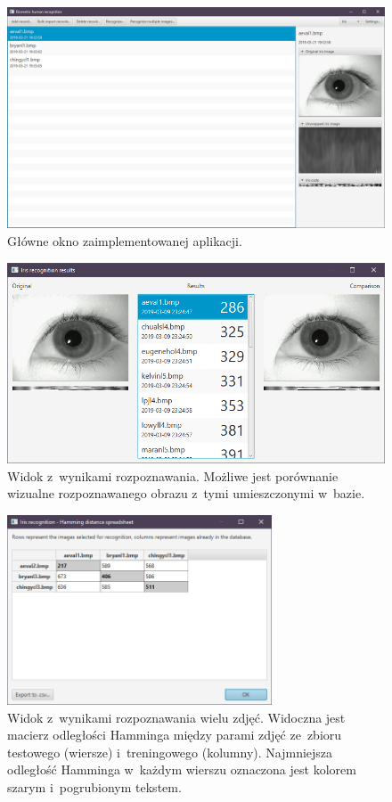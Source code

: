 \documentclass[11pt,a4paper]{article}
\begin{document}
\begin{figure}
    \centering
    \includegraphics[width=\textwidth]{res/img/main-window.PNG}
    \caption{Główne okno zaimplementowanej aplikacji.}
    \label{fig:main-window}
\end{figure}

\begin{figure}
    \centering
    \includegraphics[width=\textwidth]{res/img/recognition-results.PNG}
    \caption{Widok z~wynikami rozpoznawania.
    Możliwe jest porównanie wizualne rozpoznawanego obrazu z~tymi umieszczonymi w~bazie.}
    \label{fig:recognition-results}
\end{figure}

\begin{figure}
    \centering
    \includegraphics[width=0.7\textwidth]{res/img/recognition-results-bulk.PNG}
    \caption{Widok z~wynikami rozpoznawania wielu zdjęć.
    Widoczna jest macierz odległości Hamminga między parami zdjęć ze~zbioru testowego (wiersze) i~treningowego (kolumny).
    Najmniejsza odległość Hamminga w~każdym wierszu oznaczona jest kolorem szarym i~pogrubionym tekstem.}
    \label{fig:recognition-results-bulk}
\end{figure}
\end{document}

